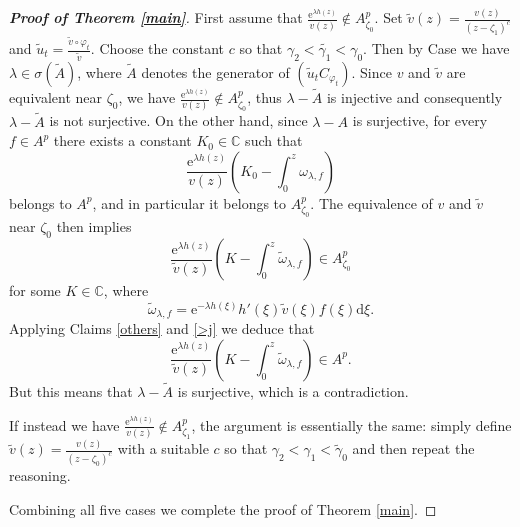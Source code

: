 \documentclass[10pt,a4paper]{amsart}
\begin{document}
\begin{proof}[\textbf{Proof of Theorem \ref{main}}]
First assume that  $\frac{\mathrm{e}^{\lambda h(z)}}{v(z)}\notin A^p_{\zeta_0}$. Set $\tilde{v}(z)=\frac{v(z)}{(z-\zeta_1)^c}$ and $\tilde{u}_t=\frac{\tilde{v}\circ\varphi_t}{\tilde{v}}$. Choose the constant $c$ so that $\gamma_2<\tilde{\gamma_1}<\gamma_0$. Then by Case \uppercase\expandafter{} we have $\lambda\in\sigma(\tilde{A})$, where $\tilde{A}$ denotes the generator of $(\tilde{u}_tC_{\varphi_t})$. Since $v$ and $\tilde{v}$ are equivalent near $\zeta_0$, we have $\frac{\mathrm{e}^{\lambda h(z)}}{v(z)}\notin A^p_{\zeta_0}$, thus $\lambda-\tilde{A}$ is injective and consequently $\lambda-\tilde{A}$ is not surjective. On the other hand, since $\lambda-A$ is surjective, for every $f\in A^p$ there exists a constant $K_0\in\mathbb{C}$ such that
$$\frac{ \mathrm{e}^{\lambda h(z)}}{v(z)}\left(K_0-\int_0^z \omega_{\lambda,f}\right)$$
belongs to $A^p$, and in particular it belongs to $A^p_{\zeta_0}$.  The equivalence of $v$ and $\tilde{v}$ near $\zeta_0$ then implies
$$\frac{ \mathrm{e}^{\lambda h(z)}}{\tilde{v}(z)}\left(K-\int_0^z \tilde{\omega}_{\lambda,f}\right)\in A_{\zeta_0}^p$$
for some $K\in\mathbb{C}$, where 
$$\tilde{\omega}_{\lambda,f}=\mathrm{e}^{-\lambda h(\xi)}h'(\xi)\tilde{v}(\xi)f(\xi) \mathrm{d}\xi.$$
Applying Claims \ref{others} and \ref{>j} we deduce that
$$\frac{ \mathrm{e}^{\lambda h(z)}}{\tilde{v}(z)}\left(K-\int_0^z \tilde{\omega}_{\lambda,f}\right)\in A^p.$$
But this means that $\lambda-\tilde{A}$ is surjective, which is a contradiction.

If instead we have $\frac{\mathrm{e}^{\lambda h(z)}}{v(z)}\notin A^p_{\zeta_1}$, the argument is essentially the same: simply define $\tilde{v}(z)=\frac{v(z)}{(z-\zeta_0)^c}$ with a suitable $c$ so that $\gamma_2<\gamma_1<\tilde{\gamma}_0$ and then repeat the reasoning.

Combining all five cases we complete the proof of Theorem \ref{main}.
\end{proof}
\end{document}
